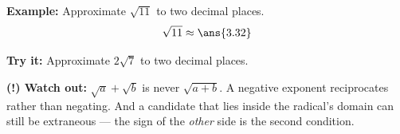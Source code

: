 \documentclass[12pt]{article}
\begin{document}
\begin{examplebox}
\textbf{Example:} Approximate $\sqrt{11}$ to two decimal places.
\[ \sqrt{11} \approx \ans{3.32} \]
\end{examplebox}

\begin{tryitbox}
\textbf{Try it:} Approximate $2\sqrt{7}$ to two decimal places.\\[2pt]
\end{tryitbox}

\begin{watchoutbox}
\textbf{(!) Watch out:} $\sqrt{a}+\sqrt{b}$ is never $\sqrt{a+b}$. A negative
exponent reciprocates rather than negating. And a candidate that lies inside the
radical's domain can still be extraneous --- the sign of the \emph{other} side is
the second condition.
\end{watchoutbox}
\end{document}
